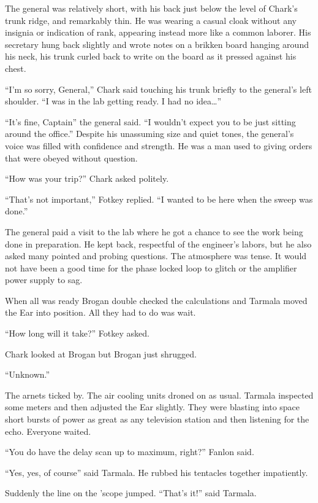 The general was relatively short, with his back just below the level of Chark's trunk ridge, and
remarkably thin. He was wearing a casual cloak without any insignia or indication of rank,
appearing instead more like a common laborer. His secretary hung back slightly and wrote notes
on a brikken board hanging around his neck, his trunk curled back to write on the board as it
pressed against his chest.

``I'm so sorry, General,'' Chark said touching his trunk briefly to the general's left shoulder.
``I was in the lab getting ready. I had no idea\ldots''

``It's fine, Captain'' the general said. ``I wouldn't expect you to be just sitting around the
office.'' Despite his unassuming size and quiet tones, the general's voice was filled with
confidence and strength. He was a man used to giving orders that were obeyed without question.

``How was your trip?'' Chark asked politely.

``That's not important,'' Fotkey replied. ``I wanted to be here when the sweep was done.''

The general paid a visit to the lab where he got a chance to see the work being done in
preparation. He kept back, respectful of the engineer's labors, but he also asked many pointed
and probing questions. The atmosphere was tense. It would not have been a good time for the
phase locked loop to glitch or the amplifier power supply to sag.

When all was ready Brogan double checked the calculations and Tarmala moved the Ear into
position. All they had to do was wait.

``How long will it take?'' Fotkey asked.

Chark looked at Brogan but Brogan just shrugged.

``Unknown.''

The arnets ticked by. The air cooling units droned on as usual. Tarmala inspected some meters
and then adjusted the Ear slightly. They were blasting into space short bursts of power as great
as any television station and then listening for the echo. Everyone waited.

``You do have the delay scan up to maximum, right?'' Fanlon said.

``Yes, yes, of course'' said Tarmala. He rubbed his tentacles together impatiently.

Suddenly the line on the 'scope jumped. ``That's it!'' said Tarmala.

